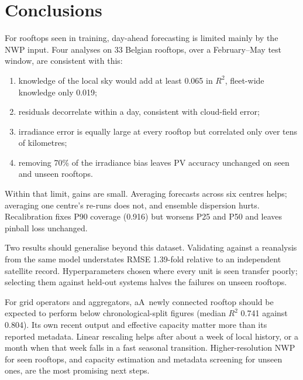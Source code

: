 \section{Conclusions}
\label{sec:conclusions}

For rooftops seen in training, day-ahead forecasting is limited mainly by the NWP input. Four analyses on 33 Belgian rooftops, over a February--May test window, are consistent with this:
\begin{enumerate}
\item knowledge of the local sky would add at least 0.065 in $R^2$, fleet-wide knowledge only 0.019;
\item residuals decorrelate within a day, consistent with cloud-field error;
\item irradiance error is equally large at every rooftop but correlated only over tens of kilometres;
\item removing 70\% of the irradiance bias leaves PV accuracy unchanged on seen and unseen rooftops.
\end{enumerate}

Within that limit, gains are small. Averaging forecasts across six centres helps; averaging one centre's re-runs does not, and ensemble dispersion hurts. Recalibration fixes P90 coverage (0.916) but worsens P25 and P50 and leaves pinball loss unchanged.

Two results should generalise beyond this dataset. Validating against a reanalysis from the same model understates RMSE 1.39-fold relative to an independent satellite record. Hyperparameters chosen where every unit is seen transfer poorly; selecting them against held-out systems halves the failures on unseen rooftops.

\ifepsr For grid operators and aggregators, a\else A\fi\ newly connected rooftop should be expected to perform below chronological-split figures (median $R^2$ 0.741 against 0.804). Its own recent output and effective capacity matter more than its reported metadata. Linear rescaling helps after about a week of local history, or a month when that week falls in a fast seasonal transition. Higher-resolution NWP for seen rooftops, and capacity estimation and metadata screening for unseen ones, are the most promising next steps.
